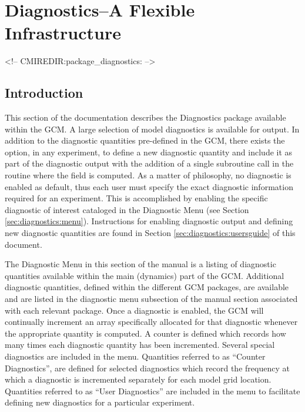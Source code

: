 \section{Diagnostics--A Flexible Infrastructure}
\label{sec:pkg:diagnostics}
\begin{rawhtml}
<!-- CMIREDIR:package_diagnostics: -->
\end{rawhtml}

\subsection{Introduction}

\noindent
This section of the documentation describes the Diagnostics package
available within the GCM.  A large selection of model diagnostics is
available for output.  In addition to the diagnostic quantities
pre-defined in the GCM, there exists the option, in any experiment, to
define a new diagnostic quantity and include it as part of the
diagnostic output with the addition of a single subroutine call in the
routine where the field is computed. As a matter of philosophy, no
diagnostic is enabled as default, thus each user must specify the
exact diagnostic information required for an experiment.  This is
accomplished by enabling the specific diagnostic of interest cataloged
in the Diagnostic Menu (see Section \ref{sec:diagnostics:menu}).
Instructions for enabling diagnostic output and defining new
diagnostic quantities are found in Section
\ref{sec:diagnostics:usersguide} of this document.

\noindent
The Diagnostic Menu in this section of the manual is a listing of
diagnostic quantities available within the main (dynamics) part of the
GCM. Additional diagnostic quantities, defined within the different
GCM packages, are available and are listed in the diagnostic menu
subsection of the manual section associated with each relevant
package. Once a diagnostic is enabled, the GCM will continually
increment an array specifically allocated for that diagnostic whenever
the appropriate quantity is computed.  A counter is defined which
records how many times each diagnostic quantity has been incremented.
Several special diagnostics are included in the menu. Quantities
referred to as ``Counter Diagnostics'', are defined for selected
diagnostics which record the frequency at which a diagnostic is
incremented separately for each model grid location.  Quantities
referred to as ``User Diagnostics'' are included in the menu to
facilitate defining new diagnostics for a particular experiment.

